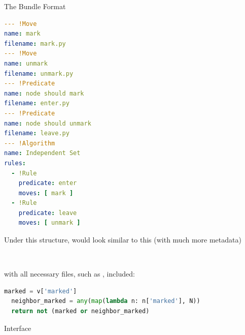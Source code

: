 \documentclass{beamer}
\begin{document}
\begin{frame}[fragile,t]
\begin{columns}[t]
\begin{column}{.45\textwidth}
\begin{block}{The Bundle Format}
        \begin{minipage}{\linewidth}
          \hfill
          \begin{minipage}{5in}
\begin{lstlisting}[language=yaml,basicstyle=\ttfamily\YAMLkeystyle\large]
--- !Move
name: mark
filename: mark.py
--- !Move
name: unmark
filename: unmark.py
--- !Predicate
name: node should mark
filename: enter.py
--- !Predicate
name: node should unmark
filename: leave.py
--- !Algorithm
name: Independent Set
rules:
  - !Rule
    predicate: enter
    moves: [ mark ]
  - !Rule
    predicate: leave
    moves: [ unmark ]
\end{lstlisting}
          \end{minipage}
          \hfill
          \begin{minipage}{5in}
            \raggedright
            Under this structure, \IndSet would look similar to this
            (with much more metadata)

            \vspace{2in}

            \large
            \linespread{1.1}

            
          \end{minipage}
          \hfill
          ~
        \end{minipage}

        with all necessary files, such as , included:
        \vspace{.3in}
\begin{lstlisting}[language=Python,stringstyle=\color{green!50!black},keywordstyle=\color{blue},basicstyle=\ttfamily\large]
  marked = v['marked']
  neighbor_marked = any(map(lambda n: n['marked'], N))
  return not (marked or neighbor_marked)
\end{lstlisting}
\vspace*{-1ex}
      \end{block}
      
      \begin{block}{Interface}


\end{block}
\end{column}
\end{columns}
\end{frame}
\end{document}
